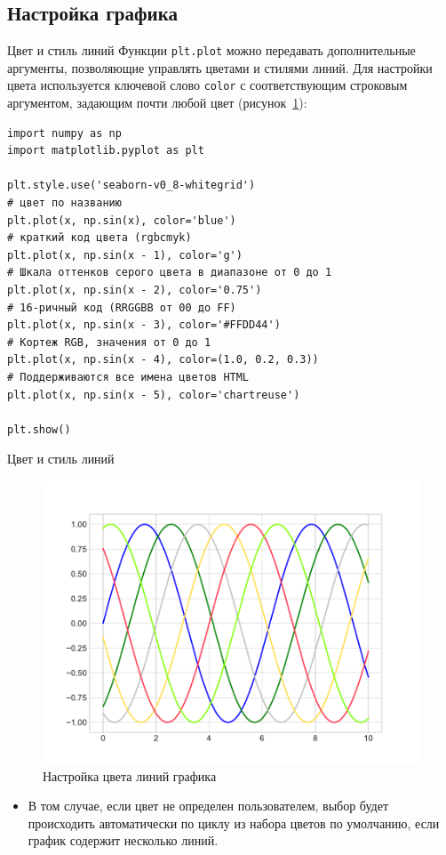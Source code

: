 \documentclass[aspectratio=169, mathserif]{beamer}	%
\begin{document}
\subsection{Настройка графика}
\begin{frame}[fragile, label=m]{Цвет и стиль линий}
\scriptsize
Функции \texttt{plt.plot} можно передавать дополнительные аргументы, позволяющие управлять цветами и стилями линий. Для настройки цвета используется ключевой слово \texttt{color} с соответствующим строковым аргументом, задающим почти любой цвет (рисунок~\ref{fig:fig_6}):
\vfill
\begin{verbatim}
import numpy as np
import matplotlib.pyplot as plt

plt.style.use('seaborn-v0_8-whitegrid')
# цвет по названию
plt.plot(x, np.sin(x), color='blue')
# краткий код цвета (rgbcmyk)
plt.plot(x, np.sin(x - 1), color='g')
# Шкала оттенков серого цвета в диапазоне от 0 до 1
plt.plot(x, np.sin(x - 2), color='0.75')
# 16-ричный код (RRGGBB от 00 до FF)
plt.plot(x, np.sin(x - 3), color='#FFDD44')
# Кортеж RGB, значения от 0 до 1
plt.plot(x, np.sin(x - 4), color=(1.0, 0.2, 0.3))
# Поддерживаются все имена цветов HTML
plt.plot(x, np.sin(x - 5), color='chartreuse')

plt.show()
\end{verbatim}
\vfill
\end{frame}

\begin{frame}[fragile, label=m]{Цвет и стиль линий}
\scriptsize
\begin{figure}[h!]
	\centering
	\includegraphics[width=.5\linewidth]{./pics/Figure_6}
	\caption{Настройка цвета линий графика}
	\label{fig:fig_6}
\end{figure}
\begin{itemize}
\item В том случае, если цвет не определен пользователем, выбор будет происходить автоматически по циклу из набора цветов по умолчанию, если график содержит несколько линий.
\end{itemize}
\vfill
\end{frame}
\end{document}
